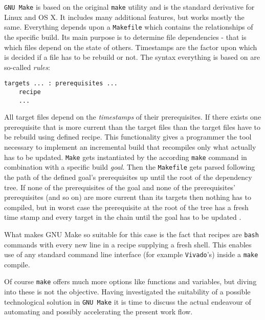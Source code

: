 \texttt{GNU Make} is based on the original \texttt{make} utility and is the standard derivative for Linux and OS X. It includes many additional features, but works mostly the same. Everything depends upon a \texttt{Makefile} which contains the relationships of the specific build. Its main purpose is to determine file dependencies - that is which files depend on the state of others. Timestamps are the factor upon which is decided if a file has to be rebuild or not. The syntax everything is based on are so-called \textit{rules}:

\begin{lstlisting}[language={[gnu] make}, title = \texttt{make} rule]
targets ... : prerequisites ...
	recipe
	...
\end{lstlisting}
\noindent
All target files depend on the \textit{timestamps }of their prerequisites. If there exists one prerequisite that is more current than the target files than the target files have to be rebuild using defined recipe. This functionality gives a programmer the tool necessary to implement an incremental build that recompiles only what actually has to be updated. \texttt{Make} gets instantiated by the according \texttt{make} command in combination with a specific build \textit{goal}. Then the \texttt{Makefile} gets parsed following the path of the defined goal's prerequisites up until the root of the dependency tree. If none of the prerequisites of the goal and none of the prerequisites' prerequisites (and so on) are more current than its targets then nothing has to compiled, but in worst case the prerequisite at the root of the tree has a fresh time stamp and every target in the chain until the goal has to be updated \cite[see][pp. 3ff]{Make16}.

What makes GNU Make so suitable for this case is the fact that recipes are \texttt{bash} commands with every new line in a recipe supplying a fresh shell. This enables use of any standard command line interface (for example \texttt{Vivado}'s) inside a \texttt{make} compile.

Of course \texttt{make} offers much more options like functions and variables, but diving into these is not the objective. Having investigated the suitability of a possible technological solution in \texttt{GNU Make} it is time to discuss the actual endeavour of automating and possibly accelerating the present work flow.